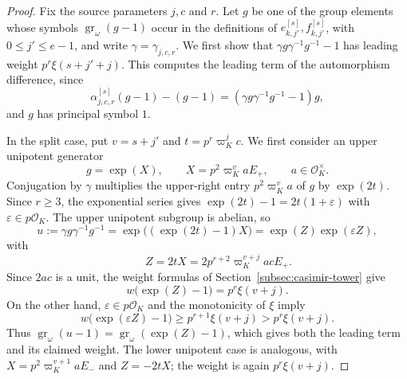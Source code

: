 \documentclass[11pt]{article}
\numberwithin{equation}{section}
\theoremstyle{definition}
\theoremstyle{remark}
\newcommand{\cO}{\mathcal O}
\DeclareMathOperator{\gr}{gr}
\begin{document}
\begin{proof}
Fix the source parameters $j,c$ and $r$.
Let $g$ be one of the group elements whose symbols
$\gr_\omega(g-1)$ occur in the definitions of
$e_{k,j'}^{[s]},f_{k,j'}^{[s]}$, with
$0\leq j'\leq e-1$, and write $\gamma=\gamma_{j,c,r}$.
We first show that $\gamma g\gamma^{-1}g^{-1}-1$ has leading
weight $p^r\xi(s+j'+j)$.
This computes the leading term of the automorphism difference,
since
\[
 \alpha^{[s]}_{j,c,r}(g-1)-(g-1)
   =(\gamma g\gamma^{-1}g^{-1}-1)g,
\]
and $g$ has principal symbol $1$.

In the split case, put $v=s+j'$ and $t=p^r\varpi_K^jc$.
We first consider an upper unipotent generator
\[
 g=\exp(X),\qquad X=p^2\varpi_K^v aE_+,
 \qquad a\in\cO_K^\times.
\]
Conjugation by $\gamma$ multiplies the upper-right entry
$p^2\varpi_K^v a$ of $g$ by $\exp(2t)$.
Since $r\geq3$, the exponential series gives
$\exp(2t)-1=2t(1+\varepsilon)$ with $\varepsilon\in p\cO_K$.
The upper unipotent subgroup is abelian, so
\[
 u:=\gamma g\gamma^{-1}g^{-1}
 =\exp\bigl((\exp(2t)-1)X\bigr)
 =\exp(Z)\exp(\varepsilon Z),
\]
with
\[
 \qquad Z=2tX=2p^{r+2}\varpi_K^{v+j}acE_+.
\]
Since $2ac$ is a unit, the weight formulas of
Section~\ref{subsec:casimir-tower} give
\[
 w\bigl(\exp(Z)-1\bigr)=p^r\xi(v+j).
\]
On the other hand, $\varepsilon\in p\cO_K$ and the monotonicity
of $\xi$ imply
\[
 w\bigl(\exp(\varepsilon Z)-1\bigr)
       \geq p^{r+1}\xi(v+j)>p^r\xi(v+j).
\]
Thus $\gr_\omega(u-1)=\gr_\omega(\exp(Z)-1)$,
which gives both the leading term and its claimed weight.
The lower unipotent case is analogous, with
$X=p^2\varpi_K^{v+1}aE_-$ and
$Z=-2tX$; the weight is again
$p^r\xi(v+j)$.


\end{proof}
\end{document}
